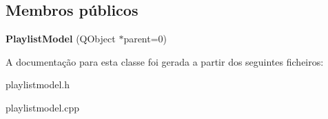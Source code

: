 \subsection*{Membros públicos}
\begin{DoxyCompactItemize}
\item 
\hypertarget{class_playlist_model_a62aaf86821f96310da890e94ff083cb8}{{\bfseries Playlist\-Model} (Q\-Object $\ast$parent=0)}\label{class_playlist_model_a62aaf86821f96310da890e94ff083cb8}

\end{DoxyCompactItemize}


A documentação para esta classe foi gerada a partir dos seguintes ficheiros\-:\begin{DoxyCompactItemize}
\item 
playlistmodel.\-h\item 
playlistmodel.\-cpp\end{DoxyCompactItemize}
